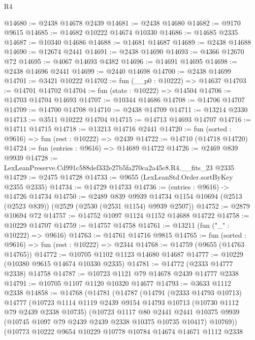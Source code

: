 \begin{lexlean}{R4}
\begin{coremodule}
@14680 := @2438 @14678 @2439
@14681 := @2438 @14680
@14682 := @9170 @9615
@14685 := @14682 @10222 @14674 @10330
@14686 := @14685 @2335
@14687 := @10340 @14686
@14688 := @14681 @14687
@14689 := @2438 @14688
@14690 := @12674 @2441
@14691 := @2438 @14690
@14693 := @4366 @12670 @72
@14695 := @4067 @14693 @4382
@14696 := @14691 @14695
@14698 := @2438 @14696 @2441
@14699 := @2440 @14698
@14700 := @2438 @14699
@14701 := @3421 @10222
@14702 := fun (__p0 : @10222) => @14637
@14703 := @14701 @14702
@14704 := fun (state : @10222) => @14504
@14706 := @14703 @14704 @14693
@14707 := @10344 @14686
@14708 := @14706 @14707
@14709 := @14700 @14708
@14710 := @2438 @14709
@14711 := @13214 @2330
@14713 := @3511 @10222 @14704
@14715 := @14713 @14693 @14707
@14716 := @14711 @14715
@14718 := @13213 @14716 @2441
@14720 := fun (sorted : @9616) => fun (rest : @10222) => @2439
@14722 := @14710 (@14718 @14720)
@14724 := fun (entries : @9616) => @14689 @14722
@14726 := @2469 @839 @9939
@14728 := LexLeanPreserve.Cd991c588def332e27b5fa270ca2a45c8.R4.__fits_23 @2335
@14729 := @2475 @14728
@14733 := @9655 (LexLeanStd.Order.sortByKey @2355 @2335)
@14734 := @14729 @14733
@14736 := (entries : @9616) -> @14726 @14734
@14750 := @2489
    @839
    @9939
    @14734
    @1154
    @10694
    (@2513 (@2523 @839))
    (@2529 (@2530 (@2531 @1154) @9939 @2507))
@14752 := @2879 @10694 @72
@14757 := @14752 @1097 @1124 @1152 @14688 @14722
@14758 := @10229 @14707
@14759 := @14757 @14758
@14761 := @13211 (fun ("_" : @10222) => @9616)
@14763 := @14761 @14716 @9815
@14765 := fun (sorted : @9616) => fun (rest : @10222) => @2344
@14768 := @14759 (@9655 (@14763 @14765))
@14772 := @10705 @1102 @1123 @14680 @14687
@14777 := @10229 (@10380 @9615 @14674 @10330 @2335)
@14781 := @14772 (@2333 @14777 @2338) @14758
@14787 := @10723 @1121 @79 @14678 @2439 @14777 @2338
@14791 := @10705 @1107 @1120 @10320 @14677
@14793 := @3633 @1112 @2338
@14858 := @14768
    (@14781
      (@14787
        (@14791
          (@2333 @14793 @10713)
          @14777
          (@10723
            @1114
            @1119
            @2439
            @9154
            @14793
            @10713
            (@10730 @1112 @79 @2439 @2338 @10735)
            (@10723
              @1117
              @80
              @2441
              @2441
              @10375
              @9939
              (@10745 @1097 @79 @2439 @2439 @2338 @10375 @10735 @10417)
              @10769))
          (@10773
            @10222
            @9654
            @10229
            @10778
            @10784
            @14674
            @14671
            @1112
            @2338

\end{coremodule}
\end{lexlean}

